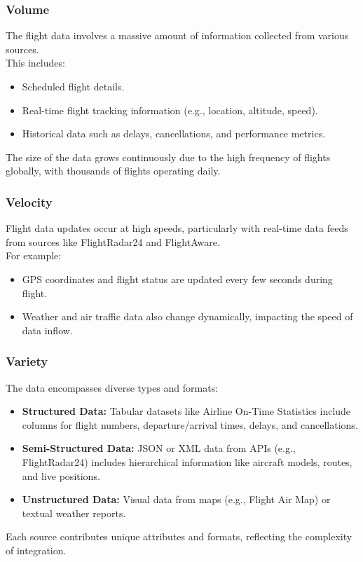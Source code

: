 \documentclass[12pt,a4paper]{article}
\begin{document}
\subsubsection{Volume}
The flight data involves a massive amount of information collected from various sources.\\
This includes:
\begin{itemize}
    \item Scheduled flight details.
    \item Real-time flight tracking information (e.g., location, altitude, speed).
    \item Historical data such as delays, cancellations, and performance metrics.
\end{itemize}
The size of the data grows continuously due to the high frequency of flights globally, with thousands of flights operating daily.

\subsubsection{Velocity}
Flight data updates occur at high speeds, particularly with real-time data feeds from sources like FlightRadar24 and FlightAware.\\
For example:
\begin{itemize}
    \item GPS coordinates and flight status are updated every few seconds during flight.
    \item Weather and air traffic data also change dynamically, impacting the speed of data inflow.
\end{itemize}

\subsubsection{Variety}
The data encompasses diverse types and formats:
\begin{itemize}
    \item \textbf{Structured Data:} Tabular datasets like Airline On-Time Statistics include columns for flight numbers, departure/arrival times, delays, and cancellations.
    \item \textbf{Semi-Structured Data:} JSON or XML data from APIs (e.g., FlightRadar24) includes hierarchical information like aircraft models, routes, and live positions.
    \item \textbf{Unstructured Data:} Visual data from maps (e.g., Flight Air Map) or textual weather reports.
\end{itemize}
Each source contributes unique attributes and formats, reflecting the complexity of integration.
\end{document}
